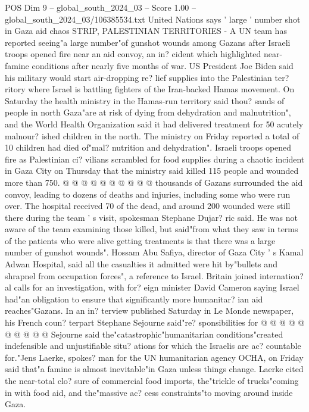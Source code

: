 \begin{textsample}{POS Dim 9 – global\_south\_2024\_03 – Score 1.00 – global\_south\_2024\_03/106385534.txt}  \label{ex:f9_pos_050}
United Nations says ' large ' number shot in Gaza aid chaos STRIP, PALESTINIAN TERRITORIES - A UN team has reported seeing"a large number"of gunshot wounds among Gazans after Israeli troops opened fire near an aid convoy, an in? cident which highlighted near-famine conditions after nearly five months of war.
US President Joe Biden said his military would start air-dropping re? lief supplies into the Palestinian ter? ritory where Israel is battling fighters of the Iran-backed Hamas movement.
On Saturday the health ministry in the Hamas-run territory said thou? sands of people in north Gaza"are at risk of dying from dehydration and malnutrition", and the World Health Organization said it had delivered treatment for 50 acutely malnour? ished children in the north.
The ministry on Friday reported a total of 10 children had died of"mal? nutrition and dehydration".
Israeli troops opened fire as Palestinian ci? vilians scrambled for food supplies during a chaotic incident in Gaza City on Thursday that the ministry said killed 115 people and wounded more than 750. @ @ @ @ @ @ @ @ @ @ thousands of Gazans surrounded the aid convoy, leading to dozens of deaths and injuries, including some who were run over.
The hospital received 70 of the dead, and around 200 wounded were still there during the team ' s visit, spokesman Stephane Dujar? ric said.
He was not aware of the team examining those killed, but said"from what they saw in terms of the patients who were alive getting treatments is that there was a large number of gunshot wounds".
Hossam Abu Safiya, director of Gaza City ' s Kamal Adwan Hospital, said all the casualties it admitted were hit by"bullets and shrapnel from occupation forces", a reference to Israel.
Britain joined internation? al calls for an investigation, with for? eign minister David Cameron saying Israel had"an obligation to ensure that significantly more humanitar? ian aid reaches"Gazans.
In an in? terview published Saturday in Le Monde newspaper, his French coun? terpart Stephane Sejourne said"re? sponsibilities for @ @ @ @ @ @ @ @ @ @ Sejourne said the"catastrophic"humanitarian conditions"created indefensible and unjustifiable situ? ations for which the Israelis are ac? countable for."Jens Laerke, spokes? man for the UN humanitarian agency OCHA, on Friday said that"a famine is almost inevitable"in Gaza unless things change.
Laerke cited the near-total clo? sure of commercial food imports, the"trickle of trucks"coming in with food aid, and the"massive ac? cess constraints"to moving around inside Gaza.

\end{textsample}
